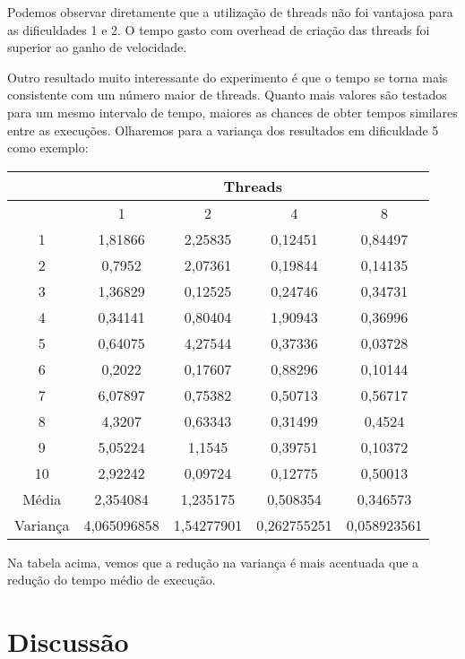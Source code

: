\documentclass[12pt]{article}
\begin{document}
Podemos observar diretamente que
a utilização de threads não foi vantajosa
para as dificuldades 1 e 2.
O tempo gasto com overhead de criação das threads
foi superior ao ganho de velocidade.

Outro resultado muito interessante do experimento
é que o tempo se torna mais consistente
com um número maior de threads.
Quanto mais valores são testados para um mesmo intervalo de tempo,
maiores as chances de obter tempos similares entre as execuções.
Olharemos para a variança dos resultados em dificuldade 5 como exemplo:

\hspace{9px}

\begin{tabular}{|c|c|c|c|c|}
	\hline
	& \multicolumn{4}{c|}{Threads}\\
	\hline
	& 1	& 2	& 4	& 8\\
	\hline
	1 & 1,81866	& 2,25835 & 0,12451	& 0,84497 \\
	\hline
	2 & 0,7952 & 2,07361 & 0,19844 & 0,14135 \\
	\hline
	3 & 1,36829 & 0,12525 & 0,24746 & 0,34731 \\
	\hline
	4 & 0,34141 & 0,80404 & 1,90943 & 0,36996 \\
	\hline
	5 & 0,64075 & 4,27544 & 0,37336 & 0,03728 \\
	\hline
	6 & 0,2022 & 0,17607 & 0,88296 & 0,10144 \\
	\hline
	7 & 6,07897 & 0,75382 & 0,50713 & 0,56717 \\
	\hline
	8 & 4,3207 & 0,63343 & 0,31499 & 0,4524 \\
	\hline
	9 & 5,05224 & 1,1545 & 0,39751 & 0,10372 \\
	\hline
	10 & 2,92242 & 0,09724 & 0,12775 & 0,50013 \\ 
	\hline
	Média & 2,354084 & 1,235175 & 0,508354 & 0,346573 \\
	\hline
	Variança & 4,065096858 & 1,54277901 & 0,262755251 & 0,058923561 \\
	\hline
\end{tabular}

\hspace{20px}

Na tabela acima, vemos que a redução na variança
é mais acentuada que a redução do tempo médio de execução.

\section{Discussão}
\end{document}
